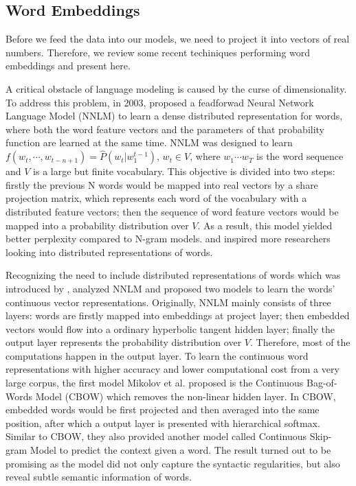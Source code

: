 \documentclass[12pt]{diazessay} %
\begin{document}
\subsection*{Word Embeddings}
Before we feed the data into our models, we need to project it into vectors of real numbers. Therefore, we review some recent techiniques performing word embeddings and present here.

A critical obstacle of language modeling is caused by the curse of dimensionality. To address this problem, in 2003, \citep{bengio2003neural} proposed a feadforwad Neural Network Language Model (NNLM) to learn a dense distributed representation\citep{hinton1986learning} for words, where both the word feature vectors and the parameters of that probability function are learned at the same time. NNLM was designed to learn $f \left( w _ { t } , \cdots , w _ { t - n + 1 } \right) = \hat { P } \left( w _ { t } | w _ { 1 } ^ { t - 1 } \right)$, $w _ { t } \in V$, where $w_1 \cdots w_T$ is the word sequence and $V$ is a large but finite vocabulary. This objective is divided into two steps: firstly the previous N words would be mapped into real vectors by a share projection matrix, which represents each word of the vocabulary with a distributed feature vectors; then the sequence of word feature vectors would be mapped into a probability distribution over $V$. As a result, this model yielded better perplexity compared to N-gram models. and inspired more researchers looking into distributed representations of words.

Recognizing the need to include distributed representations of words which was introduced by \citep{hinton1984distributed}, \citep{mikolov2013efficient} analyzed NNLM and proposed two models to learn the words' continuous vector representations. Originally, NNLM mainly consists of three layers: words are firstly mapped into embeddings at project layer; then embedded vectors would flow into a ordinary hyperbolic tangent hidden layer; finally the output layer represents the probability distribution over $V$. Therefore, most of the computations happen in the output layer. To learn the continuous word representations with higher accuracy and lower computational cost from a very large corpus, the first model Mikolov et al. proposed is the Continuous Bag-of-Words Model (CBOW) which removes the non-linear hidden layer. In CBOW, embedded words would be first projected and then averaged into the same position, after which a output layer is presented with hierarchical softmax. Similar to CBOW, they also provided another model called Continuous Skip-gram Model to predict the context given a word. The result turned out to be promising as the model did not only capture the syntactic regularities, but also reveal subtle semantic information of words.
\end{document}
